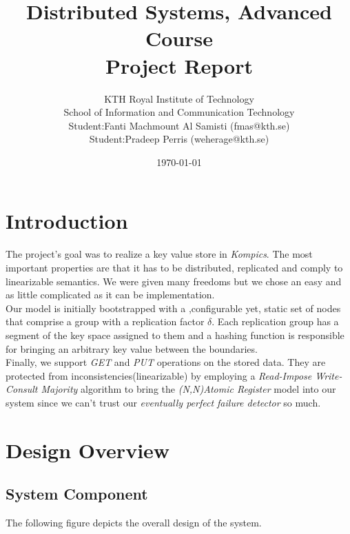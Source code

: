 \documentclass[a4paper, 11pt]{article}
\title{Distributed Systems, Advanced Course \\ 
		Project Report}
\author{KTH Royal Institute of Technology \\ 
	School of Information and Communication Technology \\
	Student:Fanti Machmount Al Samisti (fmas@kth.se) \\
	Student:Pradeep Perris (weherage@kth.se)}
\date{\today{}}
\begin{document}
\maketitle

\tableofcontents

\clearpage

\section{Introduction}

The project's goal was to realize a key value store in \textit{Kompics}. The most important properties are that it has to be distributed, replicated and comply to linearizable semantics. We were given many freedoms but we chose an easy and as little complicated as it can be implementation. \\
Our model is initially bootstrapped with a ,configurable yet, static set of nodes that comprise a group with a replication factor $\delta$. Each replication group has a segment of the key space assigned to them and a hashing function is responsible for bringing an arbitrary key value between the boundaries. \\
Finally, we support \textit{GET} and \textit{PUT} operations on the stored data. They are protected from inconsistencies(linearizable) by employing a \textit{Read-Impose Write-Consult Majority} algorithm to bring the \textit{(N,N)Atomic Register} model into our system since we can't trust our \textit{eventually perfect failure detector} so much.

\section{Design Overview}

\subsection{System Component}
The following figure depicts the overall design of the system.
\end{document}
